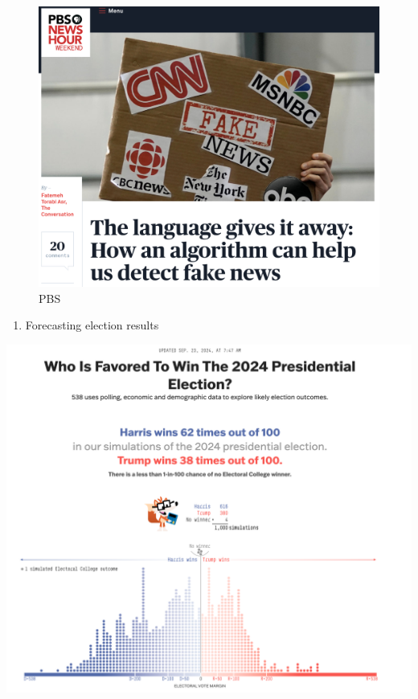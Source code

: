 \documentclass[
  letterpaper,
  DIV=11,
  numbers=noendperiod]{scrreprt}
\providecommand{\tightlist}{%
  \setlength{\itemsep}{0pt}\setlength{\parskip}{0pt}}\usepackage{longtable,booktabs,array}
\begin{document}
\begin{figure}

{\centering \includegraphics{images/fakenewsai.png}

}

\caption{PBS}

\end{figure}

\begin{enumerate}
\def\labelenumi{\arabic{enumi}.}
\setcounter{enumi}{2}
\tightlist
\item
  Forecasting election results
\end{enumerate}

\includegraphics{images/forecast24.png}
\end{document}
